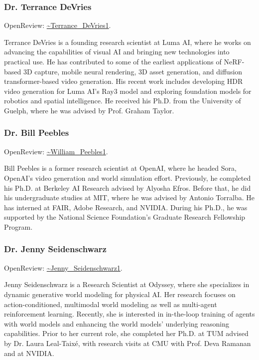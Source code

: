 \documentclass[11pt]{article}
\begin{document}
\subsubsection{Dr. Terrance DeVries}

OpenReview: \href{https://openreview.net/profile?id=\string~Terrance\_DeVries1}{\textasciitilde{}Terrance\_DeVries1}.


Terrance DeVries is a founding research scientist at Luma AI, where he works on advancing the capabilities of visual AI and bringing new technologies into practical use. He has contributed to some of the earliest applications of NeRF-based 3D capture, mobile neural rendering, 3D asset generation, and diffusion transformer-based video generation. His recent work includes developing HDR video generation for Luma AI's Ray3 model and exploring foundation models for robotics and spatial intelligence. He received his Ph.D. from the University of Guelph, where he was advised by Prof. Graham Taylor.


\subsubsection{Dr. Bill Peebles}

OpenReview: \href{https://openreview.net/profile?id=\string~William\_Peebles1}{\textasciitilde{}William\_Peebles1}.


Bill Peebles is a former research scientist at OpenAI, where he headed Sora, OpenAI's video generation and world simulation effort. Previously, he completed his Ph.D. at Berkeley AI Research advised by Alyosha Efros. Before that, he did his undergraduate studies at MIT, where he was advised by Antonio Torralba. He has interned at FAIR, Adobe Research, and NVIDIA. During his Ph.D., he was supported by the National Science Foundation's Graduate Research Fellowship Program.


\subsubsection{Dr. Jenny Seidenschwarz}

OpenReview: \href{https://openreview.net/profile?id=\string~Jenny\_Seidenschwarz1}{\textasciitilde{}Jenny\_Seidenschwarz1}.


Jenny Seidenschwarz is a Research Scientist at Odyssey, where she specializes in dynamic generative world modeling for physical AI. Her research focuses on action-conditioned, multimodal world modeling as well as multi-agent reinforcement learning. Recently, she is interested in in-the-loop training of agents with world models and enhancing the world models' underlying reasoning capabilities. Prior to her current role, she completed her Ph.D. at TUM advised by Dr. Laura Leal-Taixé, with research visits at CMU with Prof. Deva Ramanan and at NVIDIA.
\end{document}
